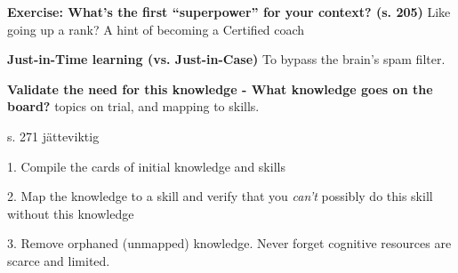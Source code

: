 \textbf{Exercise: What’s the first “superpower” for your context? (s. 205)}
Like going up a rank?
A hint of becoming a Certified coach

\textbf{Just-in-Time learning (vs. Just-in-Case)}
To bypass the brain's spam filter.

\textbf{Validate the need for this knowledge - What knowledge goes on the board?}
topics on trial, and mapping to skills.

s. 271 jätteviktig

1. Compile the cards of initial knowledge and skills

2. Map the knowledge to a skill and verify that you \textit{can’t} possibly do this skill without this knowledge

3. Remove orphaned (unmapped) knowledge. Never forget cognitive resources are scarce and limited.